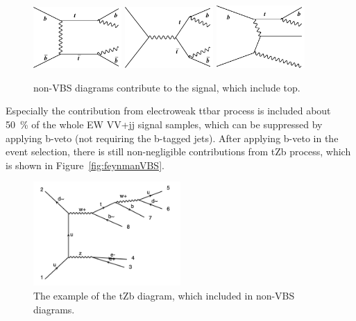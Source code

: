 \begin{figure}[H]
\begin{center}
 \includegraphics[width=0.3\textwidth,keepaspectratio]{figures/samples/feynEWKnonVBS1.pdf}
 \includegraphics[width=0.3\textwidth,keepaspectratio]{figures/samples/feynEWKnonVBS2.pdf}
 \includegraphics[width=0.3\textwidth,keepaspectratio]{figures/samples/feynEWKnonVBS7.pdf}
 \caption[f]{
non-VBS diagrams contribute to the signal, which include top.
}
\label{fig:feynmanEWKnonVBS2}
\end{center}
\end{figure}

Especially the contribution from electroweak ttbar process is included about 50~\% of the whole EW VV+jj signal samples, which can be suppressed by applying b-veto (not requiring the b-tagged jets). After applying b-veto in the event selection, there is still non-negligible contributions from tZb process, which is shown in Figure~\ref{fig:feynmanVBS}. 

\begin{figure}[H]
\begin{center}
\includegraphics[width=0.5\textwidth,keepaspectratio]{figures/samples/feynEWKnonVBStZb.pdf}
\caption{
The example of the tZb diagram, which included in non-VBS diagrams.
}
\label{fig:feynmantZb}
\end{center}
\end{figure}


